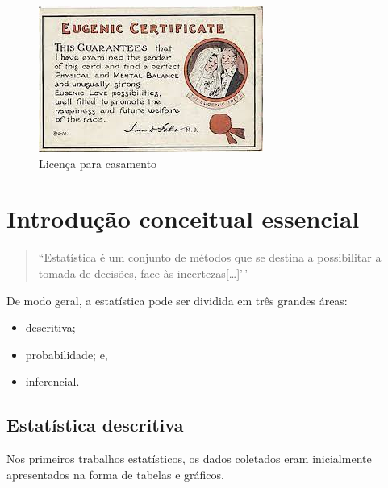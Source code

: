 \documentclass[
]{book}
\providecommand{\tightlist}{%
  \setlength{\itemsep}{0pt}\setlength{\parskip}{0pt}}
\begin{document}
\hfill\break

\begin{figure}

{\centering \includegraphics[width=0.75\linewidth]{images1/choosing_love_over_eugenics} 

}

\caption{Licença para casamento}\label{fig:figA18}
\end{figure}

\hypertarget{introduuxe7uxe3o-conceitual-essencial}{%
\chapter{Introdução conceitual essencial}\label{introduuxe7uxe3o-conceitual-essencial}}

\begin{quote}
``Estatística é um conjunto de métodos que se destina a possibilitar a tomada de decisões, face às incertezas{[}\ldots{]}'\,'
\end{quote}

De modo geral, a estatística pode ser dividida em três grandes áreas:

\begin{itemize}
\tightlist
\item
  descritiva;
\item
  probabilidade; e,
\item
  inferencial.
\end{itemize}

\hypertarget{estatuxedstica-descritiva}{%
\section{Estatística descritiva}\label{estatuxedstica-descritiva}}

Nos primeiros trabalhos estatísticos, os dados coletados eram inicialmente apresentados na forma de tabelas e gráficos.
\end{document}
